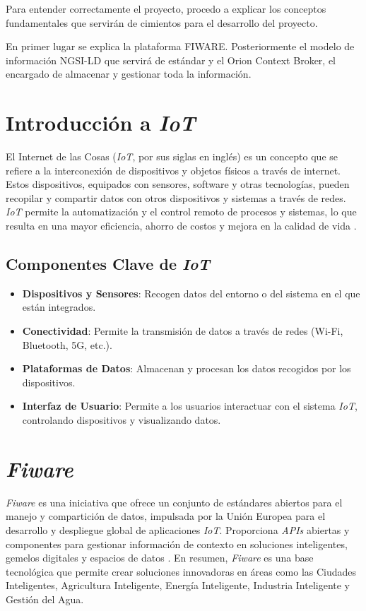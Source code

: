 
Para entender correctamente el proyecto, procedo a explicar los conceptos fundamentales que servirán de cimientos para el desarrollo del proyecto.

En primer lugar se explica la plataforma FIWARE. Posteriormente el modelo de información NGSI-LD que servirá de estándar y el Orion Context Broker, el encargado de almacenar y gestionar toda la información.

\section{Introducción a \textit{IoT}}

El Internet de las Cosas (\textit{IoT}, por sus siglas en inglés) es un concepto que se refiere a la interconexión de dispositivos y objetos físicos a través de internet. Estos dispositivos, equipados con sensores, software y otras tecnologías, pueden recopilar y compartir datos con otros dispositivos y sistemas a través de redes. \textit{IoT} permite la automatización y el control remoto de procesos y sistemas, lo que resulta en una mayor eficiencia, ahorro de costos y mejora en la calidad de vida \cite{McEwen2013, Ashton2009, Gartner2023}.

\subsection{Componentes Clave de \textit{IoT}}

\begin{itemize}
    \item \textbf{Dispositivos y Sensores}: Recogen datos del entorno o del sistema en el que están integrados.
    \item \textbf{Conectividad}: Permite la transmisión de datos a través de redes (Wi-Fi, Bluetooth, 5G, etc.).
    \item \textbf{Plataformas de Datos}: Almacenan y procesan los datos recogidos por los dispositivos.
    \item \textbf{Interfaz de Usuario}: Permite a los usuarios interactuar con el sistema \textit{IoT}, controlando dispositivos y visualizando datos.
\end{itemize}

\section{\textit{Fiware}}
\textit{Fiware} es una iniciativa que ofrece un conjunto de estándares abiertos para el manejo y compartición de datos, impulsada por la Unión Europea para el desarrollo y despliegue global de aplicaciones \textit{IoT}. Proporciona \textit{APIs} abiertas y componentes para gestionar información de contexto en soluciones inteligentes, gemelos digitales y espacios de datos \cite{fiware}. En resumen, \textit{Fiware} es una base tecnológica que permite crear soluciones innovadoras en áreas como las Ciudades Inteligentes, Agricultura Inteligente, Energía Inteligente, Industria Inteligente y Gestión del Agua. 


